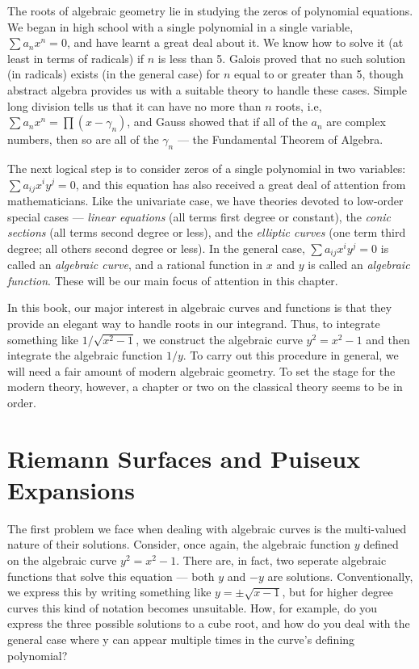 

The roots of algebraic geometry lie in studying the zeros of
polynomial equations.  We began in high school with a single
polynomial in a single variable, $\sum a_n x^n = 0$, and have learnt a
great deal about it.  We know how to solve it (at least in terms of
radicals) if $n$ is less than 5.  Galois proved that no such solution
(in radicals) exists (in the general case) for $n$ equal to or greater
than 5, though abstract algebra provides us with a suitable theory to
handle these cases.  Simple long division tells us that it can have no
more than $n$ roots, i.e, $\sum a_n x^n = \prod (x-\gamma_n)$, and
Gauss showed that if all of the $a_n$ are complex numbers, then so are
all of the $\gamma_n$ --- the Fundamental Theorem of Algebra.

The next logical step is to consider zeros of a single polynomial in
two variables: $\sum a_{ij} x^i y^j = 0$, and this equation has also
received a great deal of attention from mathematicians.  Like the
univariate case, we have theories devoted to low-order special cases
--- {\it linear equations} (all terms first degree or constant), the
{\it conic sections} (all terms second degree or less), and the {\it
elliptic curves} (one term third degree; all others second degree or
less).  In the general case, $\sum a_{ij} x^i y^j = 0$ is called an
{\it algebraic curve}, and a rational function in $x$ and $y$ is
called an {\it algebraic function}.  These will be our main focus of
attention in this chapter.

In this book, our major interest in algebraic curves and functions is
that they provide an elegant way to handle roots in our integrand.
Thus, to integrate something like $1/\sqrt{x^2-1}$, we construct the
algebraic curve $y^2 = x^2 - 1$ and then integrate the algebraic
function $1/y$.  To carry out this procedure in general, we will need a
fair amount of modern algebraic geometry.  To set the stage for the
modern theory, however, a chapter or two on the classical theory seems
to be in order.

\section{Riemann Surfaces and Puiseux Expansions}

The first problem we face when dealing with algebraic curves is the
multi-valued nature of their solutions.  Consider, once again, the
algebraic function $y$ defined on the algebraic curve $y^2 = x^2 - 1$.
There are, in fact, two seperate algebraic functions that solve this
equation --- both $y$ and $-y$ are solutions.  Conventionally, we
express this by writing something like $y = \pm\sqrt{x-1}$, but for
higher degree curves this kind of notation becomes unsuitable.  How,
for example, do you express the three possible solutions to a cube
root, and how do you deal with the general case where y can appear
multiple times in the curve's defining polynomial?

